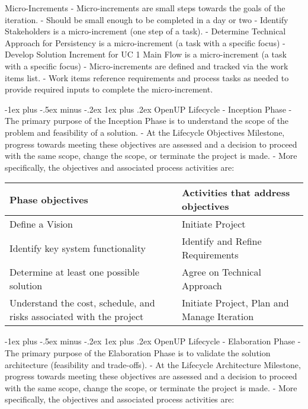 \documentclass[a4paper]{article}
\makeatletter
\renewcommand{\subsubsection}{\@startsection{subsubsection}{3}{0mm}%
                                {-1ex plus -.5ex minus -.2ex}%
                                {1ex plus .2ex}%
                                {\normalfont\small\bfseries}}
\makeatother
\begin{document}
\begin{multicols}{3}
  Micro-Increments
  - Micro-increments are small steps towards the goals of the iteration.
  - Should be small enough to be completed in a day or two
      - Identify Stakeholders is a micro-increment (one step of a task).
      - Determine Technical Approach for Persistency is a micro-increment (a task with a specific
         focus)
      - Develop Solution Increment for UC 1 Main Flow is a micro-increment (a task with a
         specific focus)
  - Micro-increments are defined and tracked via the work items list.
  - Work items reference requirements and process tasks as needed to provide
      required inputs to complete the micro-increment.
  
  \subsubsection{OpenUP Lifecycle - Inception Phase}
  - The primary purpose of the Inception Phase is to understand the scope of the problem and feasibility of a solution.
  - At the Lifecycle Objectives Milestone, progress towards meeting these objectives are assessed and a decision to proceed with the same scope, change the scope, or terminate the project is made.
  - More specifically, the objectives and associated process activities are:
  
  \begin{tabular}{l|l}
  Phase objectives                                                     & Activities that address objectives          \\\hline
  Define a Vision                                                      & Initiate Project                            \\
  Identify key system functionality                                    & Identify and Refine Requirements            \\
  Determine at least one possible solution                             & Agree on Technical Approach                 \\
  Understand the cost, schedule, and risks associated with the project & Initiate Project, Plan and Manage Iteration 
  \end{tabular}
  
  \subsubsection{OpenUP Lifecycle - Elaboration Phase}
  - The primary purpose of the Elaboration Phase is to validate the solution architecture (feasibility and trade-offs).
  - At the Lifecycle Architecture Milestone, progress towards meeting these objectives are assessed and a decision to proceed with the same scope, change the scope, or terminate the project is made.
  - More specifically, the objectives and associated process activities are:
  

\end{multicols}
\end{document}
